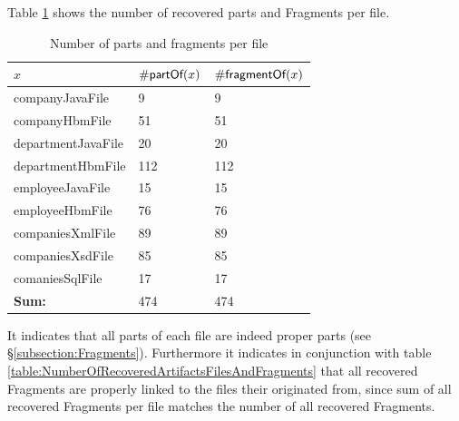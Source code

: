 Table \ref{table:NumberOfPartsAndFragmentsPerFile} shows the number of recovered parts and \glspl{Fragment} per file. 
\begin{table}[h!]
\begin{center}
\begin{tabular}{|l|l|l|}
\hline
$x$ & $\#\textsf{partOf}(x)$ & $\#\textsf{fragmentOf}(x)$
\\ \hline
companyJavaFile & 9 & 9 
\\ \hline
companyHbmFile & 51 & 51 
\\ \hline
departmentJavaFile & 20 & 20 
\\ \hline
departmentHbmFile & 112 & 112 
\\ \hline
employeeJavaFile & 15 & 15 
\\ \hline
employeeHbmFile & 76 & 76 
\\ \hline
companiesXmlFile & 89 & 89 
\\ \hline
companiesXsdFile & 85 & 85 
\\ \hline
comaniesSqlFile & 17 & 17 
\\ \hline \hline
\textbf{Sum:} & 474 & 474 
\\ \hline 
\end{tabular}
\end{center}
\caption{Number of parts and fragments per file}
\label{table:NumberOfPartsAndFragmentsPerFile}
\end{table}
It indicates that all parts of each file are indeed proper parts (see §\ref{subsection:Fragments}).
Furthermore it indicates in conjunction with table \ref{table:NumberOfRecoveredArtifactsFilesAndFragments} that all recovered \glspl{Fragment} are properly linked to the files their originated from, since sum of all recovered \glspl{Fragment} per file matches the number of all recovered \glspl{Fragment}.

